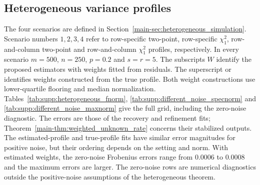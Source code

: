 \documentclass[numsec,webpdf,modern,large,namedate]{oup-authoring-template}
\theoremstyle{plain}
\theoremstyle{remark}
\newif\ifmarkchanges
\newenvironment{revision}{\begingroup\ifmarkchanges\color{red}\fi}{\endgroup}
\begin{document}
\begin{revision}
\subsection{Heterogeneous variance profiles}
The four scenarios are defined in Section~\ref{main-sec:heterogeneous_simulation}. Scenario numbers $1,2,3,4$ refer to row-specific two-point, row-specific $\chi_1^2$, row-and-column two-point and row-and-column $\chi_1^2$ profiles, respectively. In every scenario $m=500$, $n=250$, $p=0.2$ and $s=r=5$.
The subscripts $W$ identify the proposed estimators with weights fitted from residuals. The superscript $\mathrm{or}$ identifies weights constructed from the true profile. Both weight constructions use lower-quartile flooring and median normalization. Tables~\ref{tab:supp:heterogeneous_fnorm}, \ref{tab:supp:different_noise_specnorm} and \ref{tab:supp:different_noise_maxnorm} give the full grid, including the zero-noise diagnostic. The errors are those of the recovery and refinement fits; Theorem~\ref{main-thm:weighted_unknown_rate} concerns their stabilized outputs.
The estimated-profile and true-profile fits have similar error magnitudes for positive noise, but their ordering depends on the setting and norm. With estimated weights, the zero-noise Frobenius errors range from $0.0006$ to $0.0008$ and the maximum errors are larger. The zero-noise rows are numerical diagnostics outside the positive-noise assumptions of the heterogeneous theorem.

\end{revision}
\end{document}
